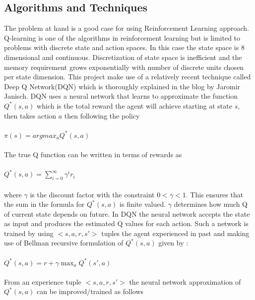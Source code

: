\documentclass{article}
\begin{document}
\subsection*{Algorithms and Techniques}
The problem at hand is a good case for using Reinforcement Learning approach. Q-learning is one of the algorithms in reinforcement learning but is limited to problems with discrete state and action spaces. In this case the state space is 8 dimensional and continuous. Discretization of state space is inefficient and the memory requirement grows exponentially with number of discrete units chosen per state dimension. This project make use of a relatively recent technique called Deep Q Network(DQN)\cite{DQN} which is thoroughly explained in the blog by Jaromir Janisch\cite{Jaromir}. DQN uses a neural network that learns to approximate the function 
$Q^*(s, a)$ which is the total reward the agent will achieve starting at state $s$, then takes action $a$ then following the policy\\\\$\pi(s) = argmax_a Q^*(s, a)$\\\\
The true Q function can be written in terms of rewards as\\\\$Q^*(s, a) = \sum_{i=0}^{\infty} \gamma^i r_i$\\\\ where $\gamma$ is the discount factor with the constraint $0 < \gamma < 1$. This ensures that the sum in the formula for $Q^*(s, a)$ is finite valued. $\gamma$ determines how much Q of current state depends on future. In DQN the neural network accepts the state as input and produces the estimated Q values for each action. Such a network is trained by using $<s, a, r, s'>$ tuples the agent experienced in past and making use of Bellman recursive formulation of $Q^*(s, a)$ given by :\\\\
$Q^*(s, a) = r + \gamma \max_a Q^*(s', a)$\\\\
From an experience tuple $<s, a, r, s'>$ the neural network approximation of $Q^*(s,a)$ can be improved/trained as follows
\vspace{-0.09cm}
\end{document}
